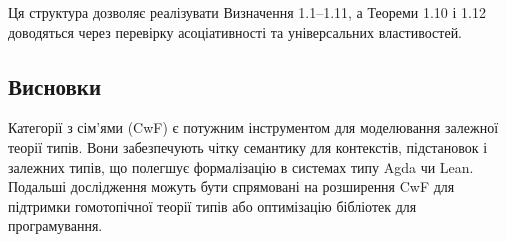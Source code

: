 \documentclass{article}
\theoremstyle{definition}
\begin{document}
Ця структура дозволяє реалізувати Визначення 1.1–1.11, а Теореми 1.10 і 1.12 доводяться через перевірку асоціативності та універсальних властивостей.

\subsection{Висновки}

Категорії з сім’ями (CwF) є потужним інструментом для моделювання залежної теорії типів. Вони забезпечують чітку семантику для контекстів, підстановок і залежних типів, що полегшує формалізацію в системах типу Agda чи Lean. Подальші дослідження можуть бути спрямовані на розширення CwF для підтримки гомотопічної теорії типів або оптимізацію бібліотек для програмування.



\end{document}
